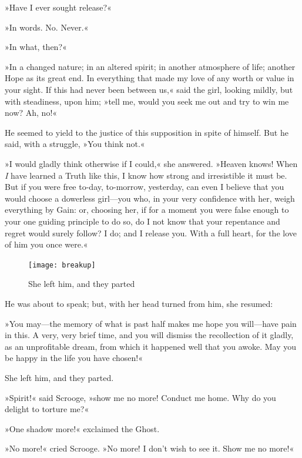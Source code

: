 »Have I ever sought release?«

»In words. No. Never.«

»In what, then?«

»In a changed nature; in an altered spirit; in another atmosphere of life; another Hope as its great end. In everything that made my love of any worth or value in your sight. If this had never been between us,« said the girl, looking mildly, but with steadiness, upon him; »tell me, would you seek me out and try to win me now? Ah, no!«

He seemed to yield to the justice of this supposition in spite of himself. But he said, with a struggle, »You think not.«

»I would gladly think otherwise if I could,« she answered. »Heav\-en knows! When \textit{I} have learned a Truth like this, I know how strong and irresistible it must be. But if you were free to-day, to-morrow, yesterday, can even I believe that you would choose a dowerless girl—you who, in your very confidence with her, weigh everything by Gain: or, choosing her, if for a moment you were false enough to your one guiding principle to do so, do I not know that your repentance and regret would surely follow? I do; and I release you. With a full heart, for the love of him you once were.«

\begin{figure}[tbh]
\begin{minipage}[c]{\textwidth}
\texttt{[image: breakup]}
\caption{She left him, and they parted}
\end{minipage}
\end{figure}

He was about to speak; but, with her head turned from him, she resumed:

»You may—the memory of what is past half makes me hope you will—have pain in this. A very, very brief time, and you will dismiss the recollection of it gladly, as an unprofitable dream, from which it happened well that you awoke. May you be happy in the life you have chosen!«

She left him, and they parted.

»Spirit!« said Scrooge, »show me no more! Conduct me home. Why do you delight to torture me?«

»One shadow more!« exclaimed the Ghost.

»No more!« cried Scrooge. »No more! I don't wish to see it. Show me no more!«

